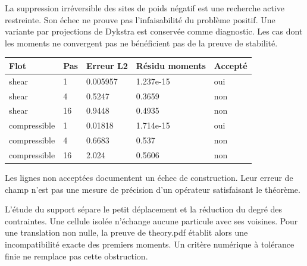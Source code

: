 \documentclass[10pt,a4paper]{article}
\begin{document}
La suppression irréversible des sites de poids négatif est une recherche active restreinte. Son échec ne prouve pas l'infaisabilité du problème positif. Une variante par projections de Dykstra est conservée comme diagnostic. Les cas dont les moments ne convergent pas ne bénéficient pas de la preuve de stabilité.

\begin{center}\small\begin{tabular}{lllll}\toprule
Flot & Pas & Erreur L2 & Résidu moments & Accepté\\\midrule
shear & 1 & 0.005957 & 1.237e-15 & oui\\
shear & 4 & 0.5247 & 0.3659 & non\\
shear & 16 & 0.9448 & 0.4935 & non\\
compressible & 1 & 0.01818 & 1.714e-15 & oui\\
compressible & 4 & 0.6683 & 0.537 & non\\
compressible & 16 & 2.024 & 0.5606 & non\\
\bottomrule\end{tabular}\end{center}
Les lignes non acceptées documentent un échec de construction. Leur erreur de champ n'est pas une mesure de précision d'un opérateur satisfaisant le théorème.

L'étude du support sépare le petit déplacement et la réduction du degré des contraintes. Une cellule isolée n'échange aucune particule avec ses voisines. Pour une translation non nulle, la preuve de theory.pdf établit alors une incompatibilité exacte des premiers moments. Un critère numérique à tolérance finie ne remplace pas cette obstruction.
\end{document}
